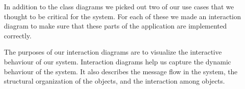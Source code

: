 In addition to the class diagrams we picked out two of our use cases that we thought to be critical for the system. For each of these we made an interaction diagram
to make sure that these parts of the application are implemented correctly. 

The purposes of our interaction diagrams are to visualize the interactive behaviour of our system. Interaction diagrams help us capture the dynamic behaviour of 
the system. It also describes the message flow in the system, the structural organization of the objects, and the interaction among objects.
